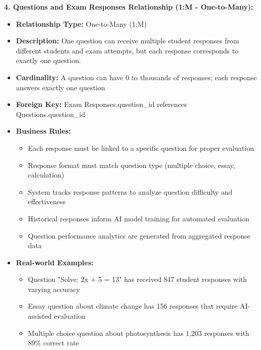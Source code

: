 \documentclass[12pt,a4paper,oneside]{book}
\begin{document}
\textbf{4. Questions and Exam Responses Relationship (1:M - One-to-Many):}
\begin{itemize}
    \item \textbf{Relationship Type:} One-to-Many (1:M)
    \item \textbf{Description:} One question can receive multiple student responses from different students and exam attempts, but each response corresponds to exactly one question.
    \item \textbf{Cardinality:} A question can have 0 to thousands of responses; each response answers exactly one question
    \item \textbf{Foreign Key:} Exam Responses.question\_id references Questions.question\_id
    \item \textbf{Business Rules:}
        \begin{itemize}
            \item Each response must be linked to a specific question for proper evaluation
            \item Response format must match question type (multiple choice, essay, calculation)
            \item System tracks response patterns to analyze question difficulty and effectiveness
            \item Historical responses inform AI model training for automated evaluation
            \item Question performance analytics are generated from aggregated response data
        \end{itemize}
    \item \textbf{Real-world Examples:}
        \begin{itemize}
            \item Question "Solve: 2x + 5 = 13" has received 847 student responses with varying accuracy
            \item Essay question about climate change has 156 responses that require AI-assisted evaluation
            \item Multiple choice question about photosynthesis has 1,203 responses with 89\% correct rate
        \end{itemize}
\end{itemize}
\end{document}
